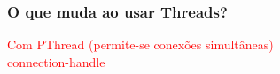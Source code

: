 \documentclass[10pt, xcolor=x11names]{beamer}
\begin{document}
\begin{frame}\frametitle{O que muda ao usar Threads?}
	\textcolor{red}{Com PThread (permite-se conexões simultâneas)}\\
	\textcolor{red}{connection-handle}\\
		
\end{frame}
\end{document}
